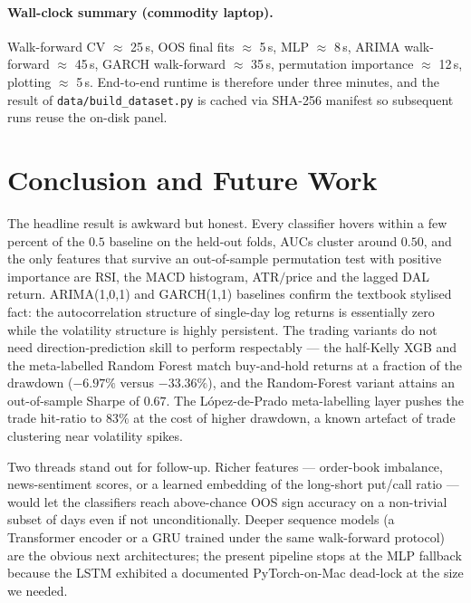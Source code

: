 \documentclass[runningheads]{llncs}
\begin{document}
\paragraph{Wall-clock summary (commodity laptop).} Walk-forward CV
$\approx$ 25\,s, OOS final fits $\approx$ 5\,s, MLP $\approx$ 8\,s,
ARIMA walk-forward $\approx$ 45\,s, GARCH walk-forward $\approx$
35\,s, permutation importance $\approx$ 12\,s, plotting $\approx$
5\,s. End-to-end runtime is therefore under three minutes, and the
result of \verb|data/build_dataset.py| is cached via SHA-256 manifest
so subsequent runs reuse the on-disk panel.

\section{Conclusion and Future Work}\label{sec:conclusion}
The headline result is awkward but honest. Every classifier hovers
within a few percent of the $0.5$ baseline on the held-out folds,
AUCs cluster around $0.50$, and the only features that survive an
out-of-sample permutation test with positive importance are RSI, the
MACD histogram, ATR$/$price and the lagged DAL return.
ARIMA(1,0,1) and GARCH(1,1) baselines confirm the textbook stylised
fact: the autocorrelation structure of single-day log returns is
essentially zero while the volatility structure is highly persistent.
The trading variants do not need direction-prediction skill to
perform respectably --- the half-Kelly XGB and the meta-labelled
Random Forest match buy-and-hold returns at a fraction of the
drawdown ($-6.97\%$ versus $-33.36\%$), and the Random-Forest
variant attains an out-of-sample Sharpe of $\num{0.67}$. The
López-de-Prado meta-labelling layer pushes the trade hit-ratio to
$83\%$ at the cost of higher drawdown, a known artefact of trade
clustering near volatility spikes.

Two threads stand out for follow-up. Richer features --- order-book
imbalance, news-sentiment scores, or a learned embedding of the
long-short put/call ratio --- would let the classifiers reach
above-chance OOS sign accuracy on a non-trivial subset of days even
if not unconditionally. Deeper sequence models (a Transformer
encoder or a GRU trained under the same walk-forward protocol) are
the obvious next architectures; the present pipeline stops at the
MLP fallback because the LSTM exhibited a documented PyTorch-on-Mac
dead-lock at the size we needed.
\end{document}
